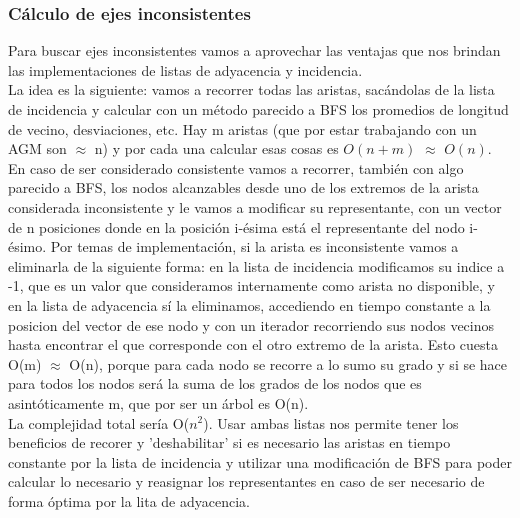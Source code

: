 \documentclass[11pt,a4paper]{article}
\begin{document}
\subsubsection{Cálculo de ejes inconsistentes}
Para buscar ejes inconsistentes vamos a aprovechar las ventajas que nos brindan las implementaciones de listas de adyacencia y incidencia. \\
La idea es la siguiente: vamos a recorrer todas las aristas, sacándolas de la lista de incidencia y calcular con un método parecido a BFS los promedios de longitud de vecino, desviaciones, etc. Hay m aristas (que por estar trabajando con un AGM son $\approx$ n) y por cada una calcular esas cosas es $O(n+m)$ $\approx$ $O(n)$. En caso de ser considerado consistente vamos a recorrer, también con algo parecido a BFS, los nodos alcanzables desde uno de los extremos de la arista considerada inconsistente y le vamos a modificar su representante, con un vector de n posiciones donde en la posición i-ésima está el representante del nodo i-ésimo. Por temas de implementación, si la arista es inconsistente vamos a eliminarla de la siguiente forma: en la lista de incidencia modificamos su indice a -1, que es un valor que consideramos internamente como arista no disponible, y en la lista de adyacencia sí la eliminamos, accediendo en tiempo constante a la posicion del vector de ese nodo y con un iterador recorriendo sus nodos vecinos hasta encontrar el que corresponde con el otro extremo de la arista. Esto cuesta O(m) $\approx$ O(n), porque para cada nodo se recorre a lo sumo su grado y si se hace para todos los nodos será la suma de los grados de los nodos que es asintóticamente m, que por ser un árbol es O(n).\\
La complejidad total sería O($n^{2}$). Usar ambas listas nos permite tener los beneficios de recorer y 'deshabilitar' si es necesario las aristas en tiempo constante por la lista de incidencia y utilizar una modificación de BFS para poder calcular lo necesario y reasignar los representantes en caso de ser necesario de forma óptima por la lita de adyacencia.
\end{document}
